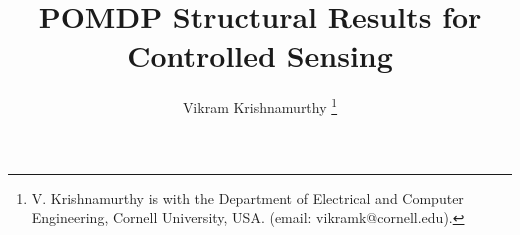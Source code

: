 \documentclass[draftcls,onecolumn]{IEEEtran}
\begin{document}
\title{POMDP Structural Results for Controlled Sensing}
\author{Vikram Krishnamurthy
\thanks{V. Krishnamurthy is
 with the Department of Electrical and Computer
Engineering, Cornell University, USA. 
(email:  vikramk@cornell.edu).}}


\maketitle


%

\end{document}
